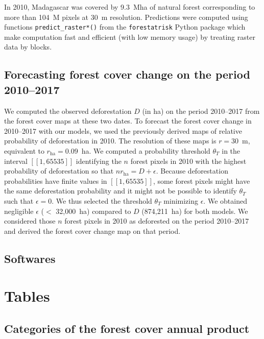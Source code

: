 \documentclass[12pt,]{article}
\begin{document}
In 2010, Madagascar was covered by 9.3~Mha of natural forest corresponding to more than 104~M pixels at 30~m resolution. Predictions were computed using functions \texttt{predict\_raster*()} from the \texttt{forestatrisk} Python package which make computation fast and efficient (with low memory usage) by treating raster data by blocks.

\hypertarget{forecasting-forest-cover-change-on-the-period-20102017}{%
\subsection{Forecasting forest cover change on the period 2010--2017}\label{forecasting-forest-cover-change-on-the-period-20102017}}

We computed the observed deforestation \(D\) (in ha) on the period 2010--2017 from the forest cover maps at these two dates. To forecast the forest cover change in 2010--2017 with our models, we used the previously derived maps of relative probability of deforestation in 2010. The resolution of these maps is \(r=30\)~m, equivalent to \(r_{\text{ha}}=0.09\)~ha. We computed a probability threshold \(\theta_T\) in the interval \([\![1, 65535]\!]\) identifying the \(n\) forest pixels in 2010 with the highest probability of deforestation so that \(n r_{\text{ha}} = D + \epsilon\). Because deforestation probabilities have finite values in \([\![1, 65535]\!]\), some forest pixels might have the same deforestation probability and it might not be possible to identify \(\theta_T\) such that \(\epsilon=0\). We thus selected the threshold \(\theta_T\) minimizing \(\epsilon\). We obtained negligible \(\epsilon\) (\(<\) 32,000~ha) compared to \(D\) (874,211~ha) for both models. We considered those \(n\) forest pixels in 2010 as deforested on the period 2010--2017 and derived the forest cover change map on that period.

\hypertarget{softwares}{%
\subsection{Softwares}\label{softwares}}

\newpage

\hypertarget{tables}{%
\section{Tables}\label{tables}}

\hypertarget{categories-of-the-forest-cover-annual-product}{%
\subsection{Categories of the forest cover annual product}\label{categories-of-the-forest-cover-annual-product}}
\end{document}
